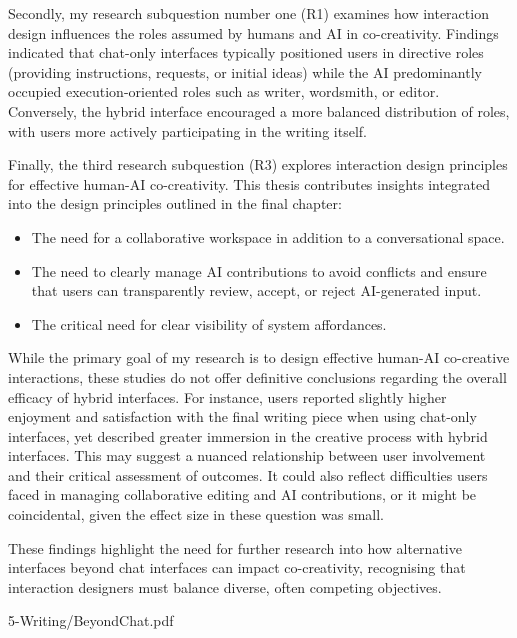 Secondly, my research subquestion number one (R1) examines how interaction design influences the roles assumed by humans and AI in co-creativity. Findings indicated that chat-only interfaces typically positioned users in directive roles (providing instructions, requests, or initial ideas) while the AI predominantly occupied execution-oriented roles such as writer, wordsmith, or editor. Conversely, the hybrid interface encouraged a more balanced distribution of roles, with users more actively participating in the writing itself.

Finally, the third research subquestion (R3) explores interaction design principles for effective human-AI co-creativity. This thesis contributes insights integrated into the design principles outlined in the final chapter:

\begin{itemize}
    \item The need for a collaborative workspace in addition to a conversational space.
    \item The need to clearly manage AI contributions to avoid conflicts and ensure that users can transparently review, accept, or reject AI-generated input.
    \item The critical need for clear visibility of system affordances.
\end{itemize}

While the primary goal of my research is to design effective human-AI co-creative interactions, these studies do not offer definitive conclusions regarding the overall efficacy of hybrid interfaces. For instance, users reported slightly higher enjoyment and satisfaction with the final writing piece when using chat-only interfaces, yet described greater immersion in the creative process with hybrid interfaces. This may suggest a nuanced relationship between user involvement and their critical assessment of outcomes. It could also reflect difficulties users faced in managing collaborative editing and AI contributions, or it might be coincidental, given the effect size in these question was small.

These findings highlight the need for further research into how alternative interfaces beyond chat interfaces can impact co-creativity, recognising that interaction designers must balance diverse, often competing objectives.


{5-Writing/BeyondChat.pdf}
